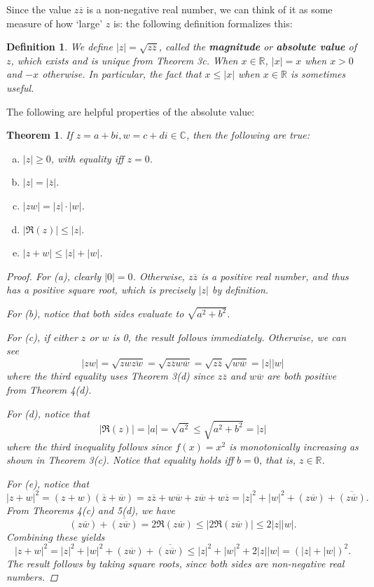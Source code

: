 \documentclass{scrbook}
\newcommand{\R}{\mathbb{R}}
\newcommand{\C}{\mathbb{C}}
\renewcommand{\bar}{\overline}
\newtheorem{theorem}{Theorem}
\newtheorem{definition}{Definition}
\begin{document}
Since the value $z\bar{z}$ is a non-negative real number, we can think of it as some measure of how `large' $z$ is: the following definition formalizes this:
\begin{definition}
We define $|z| = \sqrt{z\bar{z}}$, called the \textbf{magnitude} or \textbf{absolute value} of $z$, which exists and is unique from Theorem 3c. When $x \in \R$, $|x| = x$ when $x > 0$ and $-x$ otherwise. In particular, the fact that $x \le |x|$ when $x \in \R$ is sometimes useful.
\end{definition}

The following are helpful properties of the absolute value:
\begin{theorem}
If $z = a + bi, w = c + di \in \C$, then the following are true:
\begin{enumerate}[(a)]
\item $|z| \ge 0$, with equality iff $z = 0$.
\item $|z| = |\bar{z}|$.
\item $|zw| = |z| \cdot |w|$.
\item $|\Re(z)| \le |z|$.
\item $|z + w| \le |z| + |w|$.
\end{enumerate}
\begin{proof}
For (a), clearly $|0| = 0$. Otherwise, $z\bar{z}$ is a positive real number, and thus has a positive square root, which is precisely $|z|$ by definition.

For (b), notice that both sides evaluate to $\sqrt{a^2 + b^2}$.

For (c), if either $z$ or $w$ is 0, the result follows immediately. Otherwise, we can see
\[
	|zw| = \sqrt{zw \bar{zw}} = \sqrt{z\bar{z} w\bar{w}} = \sqrt{z\bar{z}} \sqrt{w\bar{w}} = |z||w|
\]
where the third equality uses Theorem 3(d) since $z\bar{z}$ and $w\bar{w}$ are both positive from Theorem 4(d).

For (d), notice that
\[
	|\Re(z)| = |a| = \sqrt{a^2} \le \sqrt{a^2 + b^2} = |z| 
\]
where the third inequality follows since $f(x) = x^2$ is monotonically increasing as shown in Theorem 3(c). Notice that equality holds iff $b = 0$, that is, $z \in \R$.

For (e), notice that
\[
	|z + w|^2 = (z + w)(\bar{z} + \bar{w}) = z\bar{z} + w\bar{w} + z\bar{w} + w\bar{z} = |z|^2 + |w|^2 + (z\bar{w}) + \bar{(z\bar{w})}.
\]
From Theorems 4(c) and 5(d), we have 
\[
(z\bar{w}) + \bar{(z\bar{w})} = 2\Re(z\bar{w}) \le |2\Re(z\bar{w})| \le 2|z||w|.
\]
Combining these yields
\[
	|z + w|^2 = |z|^2 + |w|^2 + (z\bar{w}) + \bar{(z\bar{w})} \le |z|^2 + |w|^2 + 2|z||w| = (|z| + |w|)^2.
\]
The result follows by taking square roots, since both sides are non-negative real numbers.
\end{proof}
\end{theorem}
\end{document}
